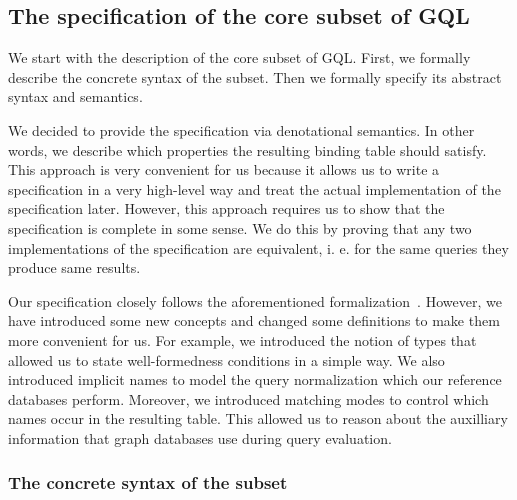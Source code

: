 \documentclass[14pt]{constructor-thesis}
\theoremstyle{definition}
\begin{document}
\subsection{The specification of the core subset of GQL}

We start with the description of the core subset of GQL. First, we formally describe the concrete syntax of the subset. Then we formally specify its abstract syntax and semantics.

We decided to provide the specification via denotational semantics. In other words, we describe which properties the resulting binding table should satisfy. This approach is very convenient for us because it allows us to write a specification in a very high-level way and treat the actual implementation of the specification later. However, this approach requires us to show that the specification is complete in some sense. We do this by proving that any two implementations of the specification are equivalent, i. e. for the same queries they produce same results.

Our specification closely follows the aforementioned formalization~\cite{GQL-formalized-on-paper}. However, we have introduced some new concepts and changed some definitions to make them more convenient for us. For example, we introduced the notion of types that allowed us to state well-formedness conditions in a simple way. We also introduced implicit names to model the query normalization which our reference databases perform. Moreover, we introduced matching modes to control which names occur in the resulting table. This allowed us to reason about the auxilliary information that graph databases use during query evaluation.

\subsubsection{The concrete syntax of the subset}
\label{sec:GQL-syntax}
\end{document}
